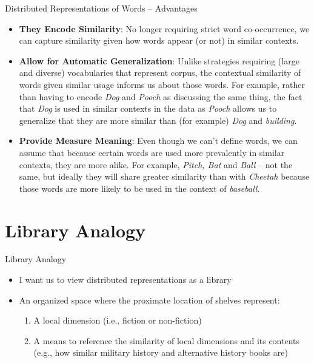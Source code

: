 \documentclass[
  ignorenonframetext,
  aspectratio=169]{beamer}
\begin{document}
\begin{frame}{Distributed Representations of Words -- Advantages}
\label{distributed-representations-of-words-advantages}
\begin{itemize}
\item \textbf{They Encode Similarity}: No longer requiring strict word co-occurrence, we can capture similarity given how words appear (or not) in similar contexts. 
\par \vspace{2.5mm} \pause
\item \textbf{Allow for Automatic Generalization}: Unlike strategies requiring (large and diverse) vocabularies that represent corpus, the contextual similarity of words given similar usage informs us about those words. For example, rather than having to encode \textit{Dog} and \textit{Pooch} as discussing the same thing, the fact that \emph{Dog} is used in similar contexts in the data as \textit{Pooch} allows us to generalize that they are more similar than (for example) \emph{Dog} and \emph{building}. 
\par \vspace{2.5mm} \pause
\item \textbf{Provide Measure Meaning}: Even though we can't define words, we can assume that because certain words are used more prevalently in similar contexts, they are more alike. For example, \emph{Pitch, Bat} and \textit{Ball} -- not the same, but ideally they will share greater similarity than with \emph{Cheetah} because those words are more likely to be used in the context of \emph{baseball}. 
\end{itemize}
\end{frame}

\section{Library Analogy}\label{library-analogy}

\begin{frame}{Library Analogy}
\label{library-analogy-1}
\begin{itemize}
\item I want us to view distributed representations as a library \par \vspace{2.5mm}
\item An organized space where the proximate location of shelves represent: 
\begin{enumerate}
\item A local dimension (i.e., fiction or non-fiction)
\item A means to reference the similarity of local dimensions and its contents (e.g., how similar military history and alternative history books are)
\end{enumerate}
\end{itemize}
\end{frame}
\end{document}
